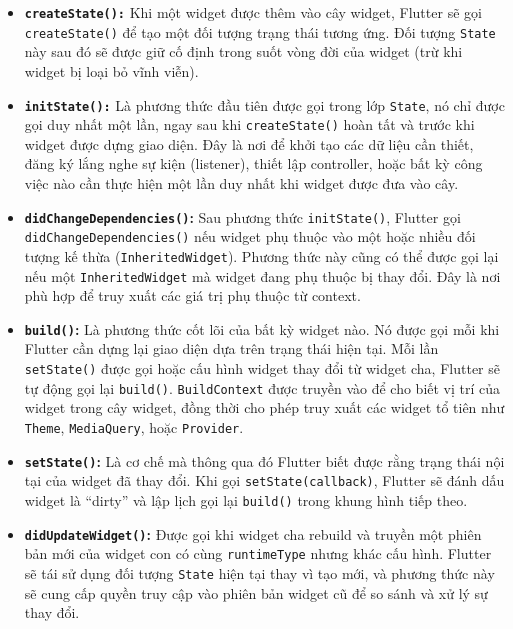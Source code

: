 \documentclass[../DoAn.tex]{subfiles}
\numberwithin{figure}{chapter}
\begin{document}
\begin{itemize}
\item \textbf{\texttt{createState():}} Khi một widget được thêm vào cây widget, Flutter sẽ gọi \texttt{createState()} để tạo một đối tượng trạng thái tương ứng. Đối tượng \texttt{State} này sau đó sẽ được giữ cố định trong suốt vòng đời của widget (trừ khi widget bị loại bỏ vĩnh viễn).

\item \textbf{\texttt{initState():}} Là phương thức đầu tiên được gọi trong lớp \texttt{State}, nó chỉ được gọi duy nhất một lần, ngay sau khi \texttt{createState()} hoàn tất và trước khi widget được dựng giao diện. Đây là nơi để khởi tạo các dữ liệu cần thiết, đăng ký lắng nghe sự kiện (listener), thiết lập controller, hoặc bất kỳ công việc nào cần thực hiện một lần duy nhất khi widget được đưa vào cây.

\item \textbf{\texttt{didChangeDependencies()}:}
Sau phương thức \texttt{initState()}, Flutter gọi \texttt{didChangeDependencies()} nếu widget phụ thuộc vào một hoặc nhiều đối tượng kế thừa (\texttt{InheritedWidget}). Phương thức này cũng có thể được gọi lại nếu một \texttt{InheritedWidget} mà widget đang phụ thuộc bị thay đổi. Đây là nơi phù hợp để truy xuất các giá trị phụ thuộc từ context.

\item \textbf{\texttt{build()}:}
Là phương thức cốt lõi của bất kỳ widget nào. Nó được gọi mỗi khi Flutter cần dựng lại giao diện dựa trên trạng thái hiện tại. Mỗi lần \texttt{setState()} được gọi hoặc cấu hình widget thay đổi từ widget cha, Flutter sẽ tự động gọi lại \texttt{build()}. \texttt{BuildContext} được truyền vào để cho biết vị trí của widget trong cây widget, đồng thời cho phép truy xuất các widget tổ tiên như \texttt{Theme}, \texttt{MediaQuery}, hoặc \texttt{Provider}.

\item \textbf{\texttt{setState()}:}
Là cơ chế mà thông qua đó Flutter biết được rằng trạng thái nội tại của widget đã thay đổi. Khi gọi \texttt{setState(callback)}, Flutter sẽ đánh dấu widget là “dirty” và lập lịch gọi lại \texttt{build()} trong khung hình tiếp theo. 

\item \textbf{\texttt{didUpdateWidget()}:}
Được gọi khi widget cha rebuild và truyền một phiên bản mới của widget con có cùng \texttt{runtimeType} nhưng khác cấu hình. Flutter sẽ tái sử dụng đối tượng \texttt{State} hiện tại thay vì tạo mới, và phương thức này sẽ cung cấp quyền truy cập vào phiên bản widget cũ để so sánh và xử lý sự thay đổi.


\end{itemize}
\end{document}
